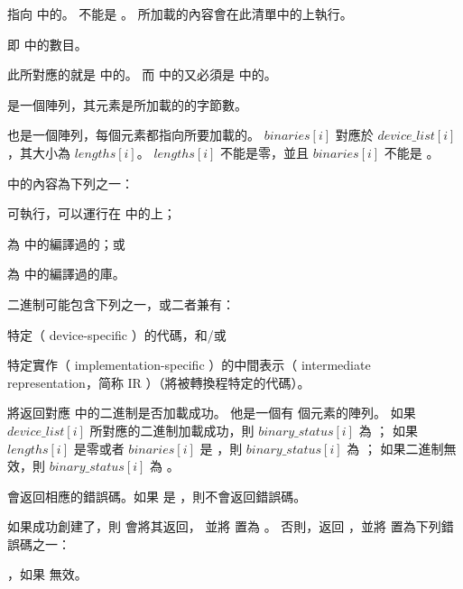  指向  中的。
 不能是 。
所加載的內容會在此清單中的上執行。

 即  中的數目。

此所對應的就是  中的。
而  中的又必須是  中的。

 是一個陣列，其元素是所加載的的字節數。

 也是一個陣列，每個元素都指向所要加載的。
$binaries[i]$ 對應於 $device\_list[i]$，其大小為 $lengths[i]$。
$lengths[i]$ 不能是零，並且 $binaries[i]$ 不能是 。

 中的內容為下列之一：
\startigBase
\item 可執行，可以運行在  中的上；

\item 為  中的編譯過的；或

\item 為  中的編譯過的庫。
\stopigBase

二進制可能包含下列之一，或二者兼有：
\startigBase
\item 特定（ device-specific ）的代碼，和/或
\item 特定實作（ implementation-specific ）的中間表示（ intermediate representation，简称 IR ）（將被轉換程特定的代碼）。
\stopigBase

 將返回對應  中的二進制是否加載成功。
他是一個有  個元素的陣列。
如果 $device\_list[i]$ 所對應的二進制加載成功，則 $binary\_status[i]$ 為 ；
如果 $lengths[i]$ 是零或者 $binaries[i]$ 是 ，則 $binary\_status[i]$ 為 ；
如果二進制無效，則 $binary\_status[i]$ 為 。

 會返回相應的錯誤碼。如果  是 ，則不會返回錯誤碼。

如果成功創建了，則  會將其返回，
並將  置為 。
否則，返回 ，並將  置為下列錯誤碼之一：
\startigBase
\item {}，如果  無效。

